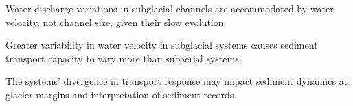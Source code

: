 \documentclass[draft]{agujournal2019}
\begin{document}





\begin{keypoints}
\item Water discharge variations in subglacial channels are accommodated by water velocity, not channel size, given their slow evolution.

\item Greater variability in water velocity in subglacial systems causes sediment transport capacity to vary more than subaerial systems.


\item The systems' divergence in transport response may impact sediment dynamics at glacier margins and interpretation of sediment records.
\end{keypoints}


% 
% 

% 
% 
\end{document}
